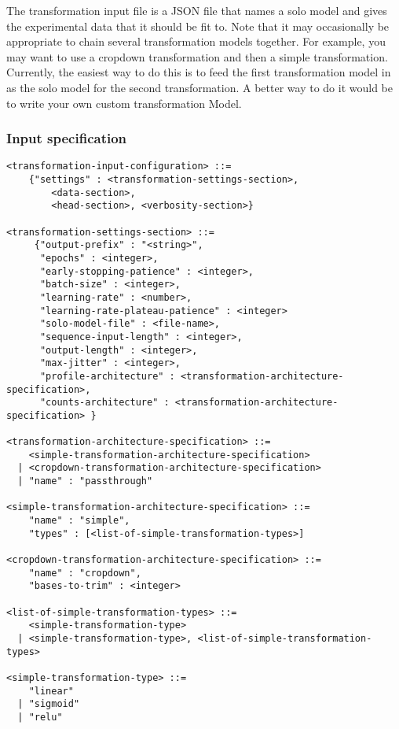 \documentclass{article}
\begin{document}
The transformation input file is a JSON file that names a solo model and gives the experimental data that it should be fit to. 
Note that it may occasionally be appropriate to chain several transformation models together.
For example, you may want to use a cropdown transformation and then a simple transformation. 
Currently, the easiest way to do this is to feed the first transformation model in as the solo model
for the second transformation. A better way to do it would be to write your own custom transformation Model.

\subsubsection{Input specification}
\begin{lstlisting}
<transformation-input-configuration> ::=
    {"settings" : <transformation-settings-section>, 
        <data-section>, 
        <head-section>, <verbosity-section>}

<transformation-settings-section> ::=
     {"output-prefix" : "<string>", 
      "epochs" : <integer>, 
      "early-stopping-patience" : <integer>, 
      "batch-size" : <integer>, 
      "learning-rate" : <number>,
      "learning-rate-plateau-patience" : <integer> 
      "solo-model-file" : <file-name>,
      "sequence-input-length" : <integer>,
      "output-length" : <integer>,
      "max-jitter" : <integer>,
      "profile-architecture" : <transformation-architecture-specification>, 
      "counts-architecture" : <transformation-architecture-specification> } 

<transformation-architecture-specification> ::= 
    <simple-transformation-architecture-specification>
  | <cropdown-transformation-architecture-specification>
  | "name" : "passthrough"

<simple-transformation-architecture-specification> ::= 
    "name" : "simple",
    "types" : [<list-of-simple-transformation-types>]

<cropdown-transformation-architecture-specification> ::=
    "name" : "cropdown", 
    "bases-to-trim" : <integer>

<list-of-simple-transformation-types> ::= 
    <simple-transformation-type>
  | <simple-transformation-type>, <list-of-simple-transformation-types>

<simple-transformation-type> ::= 
    "linear"
  | "sigmoid"
  | "relu"

\end{lstlisting}
\end{document}

